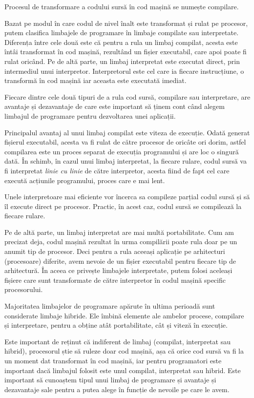 Procesul de transformare a codului sursă în cod mașină se numește compilare.

Bazat pe modul în care codul de nivel înalt este transformat și rulat pe
procesor, putem clasifica limbajele de programare în limbaje compilate sau
interpretate. Diferența între cele două este că pentru a rula un limbaj
compilat, acesta este întâi transformat în cod mașină, rezultând un fișier
executabil, care apoi poate fi rulat oricând. Pe de altă parte, un limbaj
interpretat este executat direct, prin intermediul unui interpretor.
Interpretorul este cel care ia fiecare instrucțiune, o transformă în cod mașină
iar aceasta este executată imediat.

Fiecare dintre cele două tipuri de a rula cod sursă, compilare sau interpretare,
are avantaje și dezavantaje de care este important să ținem cont când alegem
limbajul de programare pentru dezvoltarea unei aplicații.

Principalul avantaj al unui limbaj compilat este viteza de execuție. Odată
generat fișierul executabil, acesta va fi rulat de către procesor de oricâte ori
dorim, astfel compilarea este un proces separat de execuția programului și are
loc o singură dată. În schimb, în cazul unui limbaj interpretat, la fiecare
rulare, codul sursă va fi interpretat \textit{linie cu linie} de către
interpretor, acesta fiind de fapt cel care execută acțiunile programului, proces
care e mai lent.

Unele interpretoare mai eficiente vor încerca sa compileze parțial codul sursă
și să îl execute direct pe procesor. Practic, în acest caz, codul sursă se
compilează la fiecare rulare.

Pe de altă parte, un limbaj interpretat are mai multă portabilitate. Cum am
precizat deja, codul mașină rezultat în urma compilării poate rula doar pe un
anumit tip de procesor. Deci pentru a rula aceeași aplicație pe arhitecturi
(procesoare) diferite, avem nevoie de un fișier executabil pentru fiecare tip de
arhitectură. În aceea ce privește limbajele interpretate, putem folosi aceleași
fișiere care sunt transformate de către interpretor în codul mașină specific
procesorului.

Majoritatea limbajelor de programare apărute în ultima perioadă sunt considerate
limbaje hibride. Ele îmbină elemente ale ambelor procese, compilare și
interpretare, pentru a obține atât portabilitate, cât și viteză în execuție.

Este important de reținut că indiferent de limbaj (compilat, interpretat sau
hibrid), procesorul știe să ruleze doar cod mașină, așa că orice cod sursă va fi
la un moment dat transformat în cod mașină, iar pentru programatori este
important dacă limbajul folosit este unul compilat, interpretat sau hibrid. Este
important să cunoaștem tipul unui limbaj de programare și avantaje și
dezavantaje sale pentru a putea alege în funcție de nevoile pe care le avem.


